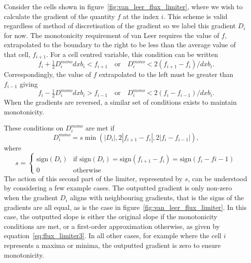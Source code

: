 Consider the cells shown in figure~\ref{fig:van_leer_flux_limiter}, where we wish to calculate the gradient of the quantity $f$ at the index $i$. This scheme is valid regardless of method of discretisation of the gradient so we label this gradient $D_i$ for now. The monotonicity requirement of van Leer requires the value of $f$, extrapolated to the boundary to the right to be less than the average value of that cell, $f_{i+1}$. For a cell centred variable, this condition can be written
\begin{equation}
  \label{eq:flux_limiter1}
f_i + \tfrac{1}{2}D_i^{mono} dxb_i < f_{i+1} \quad \text{or} \quad D_i^{mono} < 2 (f_{i+1} - f_i) / dxb_i.
\end{equation}
Correspondingly, the value of $f$ extrapolated to the left must be greater than $f_{i-1}$ giving
\begin{equation}
  \label{eq:flux_limiter2}
f_i - \tfrac{1}{2}D_i^{mono} dxb_i > f_{i-1} \quad \text{or} \quad D_i^{mono} < 2 (f_{i} - f_{i-1}) / dxb_i.
\end{equation}
When the gradients are reversed, a similar set of conditions exists to maintain monotonicity.

These conditions on $D_i^{mono}$ are met if
\begin{equation}
  \label{eq:flux_limiter3}
D_i^{mono} = s \min(|D_i|, 2 | f_{i+1} - f_i |, 2 |f_i - f_{i-1}|),
\end{equation}
where
\begin{equation}
  \label{eq:flux_limiter4}
s =
\left\{
	\begin{array}{ll}
		\text{sign}(D_i)  & \mbox{if } \text{sign}(D_i) = \text{sign}(f_{i+1} - f_i) = \text{sign}(f_{i} - f{i-1}) \\
		0 & \mbox{otherwise}
	\end{array}
\right.
\end{equation}
The action of this second part of the limiter, represented by $s$, can be understood by considering a few example cases. The outputted gradient is only non-zero when the gradient $D_i$ aligns with neighbouring gradients, that is the signs of the gradients are all equal, as is the case in figure~\ref{fig:van_leer_flux_limiter}. In this case, the outputted slope is either the original slope if the monotonicity conditions are met, or a first-order approximation otherwise, as given by equation~\eqref{eq:flux_limiter3}. In all other cases, for example where the cell $i$ represents a maxima or minima, the outputted gradient is zero to ensure monotonicity.

